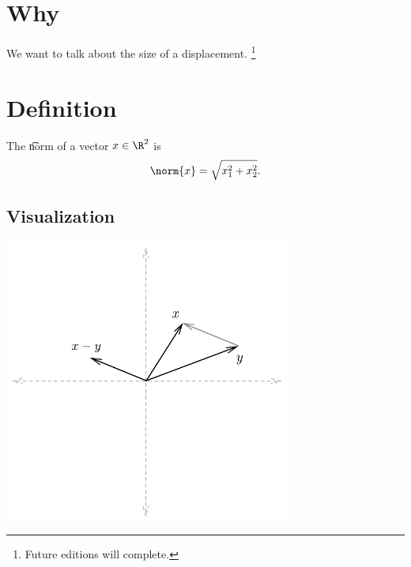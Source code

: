 
\section*{Why}

We want to talk about the size of a displacement.
  \ifhmode\unskip\fi\footnote{
Future editions will complete.
  }

\section*{Definition}

The \t{norm} of a vector $x \in \R ^2$ is
  \[
\norm{x} = \sqrt{x_1^2 + x_2^2}.
  \]

\subsection*{Visualization}

\begin{center}\includegraphics[width=0.70\textwidth]{./graphics/x-y.pdf}\end{center}
\blankpage